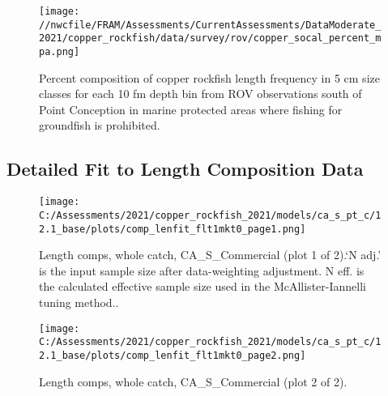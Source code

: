 \documentclass[11pt,
  english,
  a4paper,
]{article}
\begin{document}
\begin{figure}
\centering
\texttt{[image: //nwcfile/FRAM/Assessments/CurrentAssessments/DataModerate\_2021/copper\_rockfish/data/survey/rov/copper\_socal\_percent\_mpa.png]}
\caption{Percent composition of copper rockfish length frequency in 5 cm size classes for each 10 fm depth bin from ROV observations south of Point Conception in marine protected areas where fishing for groundfish is prohibited.\label{fig:rov-percent-mpa}}
\end{figure}

\tagmcend\tagstructend

\clearpage


\hypertarget{length-fit}{%
\subsection{Detailed Fit to Length Composition Data}\label{length-fit}}

\leavevmode\tagmcend\tagstructend


\begin{figure}
\centering
\texttt{[image: C:/Assessments/2021/copper\_rockfish\_2021/models/ca\_s\_pt\_c/12.1\_base/plots/comp\_lenfit\_flt1mkt0\_page1.png]}
\caption{Length comps, whole catch, CA\_S\_Commercial (plot 1 of 2).`N adj.' is the input sample size after data-weighting adjustment. N eff. is the calculated effective sample size used in the McAllister-Iannelli tuning method..\label{fig:comp_lenfit_flt1mkt0_page1}}
\end{figure}

\tagmcend\tagstructend


\begin{figure}
\centering
\texttt{[image: C:/Assessments/2021/copper\_rockfish\_2021/models/ca\_s\_pt\_c/12.1\_base/plots/comp\_lenfit\_flt1mkt0\_page2.png]}
\caption{Length comps, whole catch, CA\_S\_Commercial (plot 2 of 2).\label{fig:comp_lenfit_flt1mkt0_page2}}
\end{figure}
\end{document}
